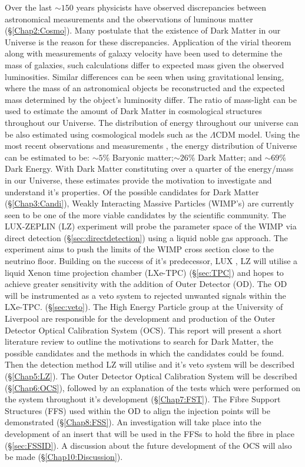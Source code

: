 Over the last $\sim150$ years physicists have observed discrepancies between astronomical measurements and the observations of luminous matter (\S\ref{Chap2:Cosmo}). Many postulate that the existence of Dark Matter in our Universe is the reason for these discrepancies. Application of the virial theorem along with measurements of galaxy velocity have been used to determine the mass of galaxies, such calculations differ to expected mass given the observed luminosities. Similar differences can be seen when using gravitational lensing, where the mass of an astronomical objects be reconstructed and the expected mass determined by the object's luminosity differ. The ratio of mass-light can be used to estimate the amount of Dark Matter in cosmological structures throughout our Universe. The distribution of energy throughout our universe can be also estimated using cosmological models such as the $\Lambda$CDM model. Using the most recent observations \cite{Planck2018} and measurements \cite{WMAP}, the energy distribution of Universe can be estimated to be: $\sim5\%$ Baryonic matter;$\sim26\%$ Dark Matter; and $\sim69\%$ Dark Energy. With Dark Matter constituting over a quarter of the energy/mass in our Universe, these estimates provide the motivation to investigate and understand it's properties. 
\newline
Of the possible candidates for Dark Matter (\S\ref{Chap3:Candi}), Weakly Interacting Massive Particles (WIMP's) are currently seen to be one of the more viable candidates by the scientific community. The LUX-ZEPLIN (LZ) experiment will probe the parameter space of the WIMP via direct detection (\S\ref{sec:directdetection}) using a liquid noble gas approach. The experiment aims to push the limits of the WIMP cross section close to the neutrino floor. Building on the success of it's predecessor, LUX \cite{LUX}, LZ will utilise a liquid Xenon time projection chamber (LXe-TPC) (\S\ref{sec:TPC}) and hopes to achieve greater sensitivity with the addition of Outer Detector (OD). The OD will be instrumented as a veto system to rejected unwanted signals within the LXe-TPC. (\S\ref{sec:veto}). The High Energy Particle group at the University of Liverpool are responsible for the development and production of the Outer Detector Optical Calibration System (OCS).
\newline
This report will present a short literature review to outline the motivations to search for Dark Matter, the possible candidates and the methods in which the candidates could be found. Then the detection method LZ will utilise and it's veto system will be described (\S\ref{Chap5:LZ}). The Outer Detector Optical Calibration System will be described (\S\ref{Chap6:OCS}), followed by an explanation of the tests which were performed on the system throughout it's development (\S\ref{Chap7:FST}). The Fibre Support Structures (FFS) used within the OD to align the injection points will be demonstrated (\S\ref{Chap8:FSS}). An investigation will take place into the development of an insert that will be used in the FFSs to hold the fibre in place (\S\ref{sec:FSSID}). A discussion about the future development of the OCS will also be made (\S\ref{Chap10:Discussion}). 